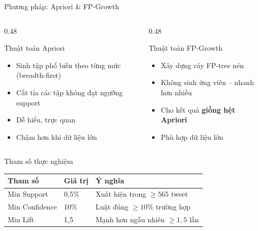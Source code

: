 \documentclass[aspectratio=169]{beamer}
\begin{document}
\begin{frame}{Phương pháp: Apriori \& FP-Growth}
  \begin{columns}[T]
    \begin{column}{0.48\textwidth}
      \begin{block}{Thuật toán Apriori}
        \small
        \begin{itemize}\setlength{\itemsep}{1pt}
          \item Sinh tập phổ biến theo từng mức (breadth-first)
          \item Cắt tỉa các tập không đạt ngưỡng support
          \item Dễ hiểu, trực quan
          \item Chậm hơn khi dữ liệu lớn
        \end{itemize}
      \end{block}
    \end{column}
    \begin{column}{0.48\textwidth}
      \begin{block}{Thuật toán FP-Growth}
        \small
        \begin{itemize}\setlength{\itemsep}{1pt}
          \item Xây dựng cây FP-tree nén
          \item Không sinh ứng viên -- nhanh hơn nhiều
          \item Cho kết quả \textbf{giống hệt Apriori}
          \item Phù hợp dữ liệu lớn
        \end{itemize}
      \end{block}
    \end{column}
  \end{columns}

  \vspace{0.3em}

  \begin{block}{Tham số thực nghiệm}
    \small\centering
    \begin{tabular}{lll}
      \toprule
      \textbf{Tham số} & \textbf{Giá trị} & \textbf{Ý nghĩa} \\
      \midrule
      Min Support    & 0,5\% & Xuất hiện trong $\geq 565$ tweet \\
      Min Confidence & 10\%  & Luật đúng $\geq 10\%$ trường hợp \\
      Min Lift       & 1,5   & Mạnh hơn ngẫu nhiên $\geq 1,5$ lần \\
      \bottomrule
    \end{tabular}
  \end{block}
\end{frame}
\end{document}
